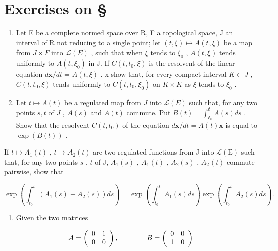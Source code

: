 \section*{Exercises on \S{}}
{}

\begin{enumerate}
\def\labelenumi{\arabic{enumi})}
\item
  Let E be a complete normed space over R, F a topological space, J an interval of R not reducing to a single point; let \((t, \xi) \mapsto A(t, \xi)\) be a map from \(J \times F\) into \(\mathcal{L}(E)\) , such that when \(\xi\) tends to \(\xi_{0}\) , \(A(t, \xi)\) tends uniformly to \(A(t, \xi_{0})\) in J. If \(C(t, t_{0}, \xi)\) is the resolvent of the linear equation \(d\mathbf{x}/dt = A(t, \xi)\) . x show that, for every compact interval \(K \subset J\) , \(C(t, t_{0}, \xi)\) tends uniformly to \(C(t, t_{0}, \xi_{0})\) on \(K \times K\) as \(\xi\) tends to \(\xi_{0}\) .
\item
  Let \(t \mapsto A(t)\) be a regulated map from \(J\) into \(\mathcal{L}(E)\) such that, for any two points \(s, t\) of \(J\) , \(A(s)\) and \(A(t)\) commute. Put \(B(t) = \int_{t_0}^{t} A(s) ds\) . Show that the resolvent \(C(t, t_0)\) of the equation \(d\mathbf{x}/dt = A(t)\mathbf{x}\) is equal to \(\exp(B(t))\) .
\end{enumerate}

If \(t \mapsto A_1(t)\) , \(t \mapsto A_2(t)\) are two regulated functions from J into \(\mathcal{L}(\mathrm{E})\) such that, for any two points \(s\) , \(t\) of J, \(A_1(s)\) , \(A_1(t)\) , \(A_2(s)\) , \(A_2(t)\) commute pairwise, show that

\[
\exp \left(\int_ {t _ {0}} ^ {t} \left(A _ {1} (s) + A _ {2} (s)\right) d s\right) = \exp \left(\int_ {t _ {0}} ^ {t} A _ {1} (s) d s\right) \exp \left(\int_ {t _ {0}} ^ {t} A _ {2} (s) d s\right).
\]

\begin{enumerate}
\def\labelenumi{\arabic{enumi})}
\setcounter{enumi}{2}
\tightlist
\item
  Given the two matrices
\end{enumerate}

\[
A = \left( \begin{array}{c c} 0 & 1 \\ 0 & 0 \end{array} \right), \qquad \qquad B = \left( \begin{array}{c c} 0 & 0 \\ 1 & 0 \end{array} \right)
\]

